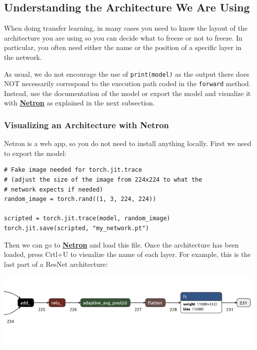 \subsection{Understanding the Architecture We Are Using}

When doing transfer learning, in many cases you need to know the layout of the architecture you are using so you can decide what to freeze or not to freeze. In particular, you often need either the name or the position of a specific layer in the network. \newline

As usual, we do not encourage the use of \verb|print(model)| as the output there does NOT necessarily correspond to the execution path coded in the \verb|forward| method. Instead, use the documentation of the model or export the model and visualize it with \href{https://netron.app/}{\textbf{Netron}} as explained in the next subsection. \newline

\subsubsection{Visualizing an Architecture with Netron}

Netron is a web app, so you do not need to install anything locally. First we need to export the model:
\begin{lstlisting}
# Fake image needed for torch.jit.trace
# (adjust the size of the image from 224x224 to what the
# network expects if needed)
random_image = torch.rand((1, 3, 224, 224))

scripted = torch.jit.trace(model, random_image)
torch.jit.save(scripted, "my_network.pt")
\end{lstlisting}
Then we can go to \href{https://netron.app/}{\textbf{Netron}} and load this file. Once the architecture has been loaded, press Crtl+U to visualize the name of each layer. For example, this is the last part of a ResNet architecture:

\includegraphics[width=1\linewidth]{img//cnn//transfer/resnet.jpeg}

